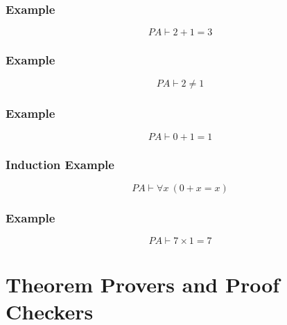 \documentclass{beamer}
\begin{document}
\begin{frame}
	\frametitle{Example}
	
	$$ PA \vdash 2 + 1 = 3$$
	
	\vspace{7cm}
	
	
\end{frame}

\begin{frame}
	\frametitle{Example}
	
	$$ PA \vdash 2 \neq 1$$

	\vspace{7cm}
	
	
\end{frame}

\begin{frame}
	\frametitle{Example}
	
	$$ PA \vdash 0 + 1 = 1$$
	
	\vspace{7cm}
	
\end{frame}

\begin{frame}
	\frametitle{Induction Example}
	
	$$ PA \vdash \forall x \ (0 + x = x)$$
	
	\vspace{7cm}
	
\end{frame}

\begin{frame}
	\frametitle{Example}
	
	$$ PA \vdash 7 \times 1 = 7$$
	
	\vspace{7cm}
	
\end{frame}


\section{Theorem Provers and Proof Checkers}
\end{document}

